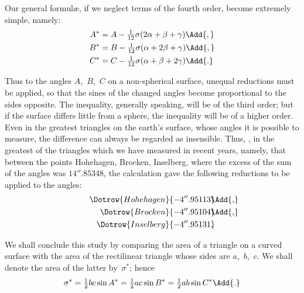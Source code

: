 
Our general formulæ, if we neglect terms of the fourth order, become extremely
simple, namely:
\begin{align*}
A^{*} &= A - \tfrac{1}{12}\sigma(2\alpha + \beta + \gamma)\Add{,} \\
B^{*} &= B - \tfrac{1}{12}\sigma(\alpha + 2\beta + \gamma)\Add{,} \\
C^{*} &= C - \tfrac{1}{12}\sigma(\alpha + \beta + 2\gamma)\Add{.}
\end{align*}

Thus to the angles $A$,~$B$,~$C$ on a non-spherical surface, unequal reductions must
be applied, so that the sines of the changed angles become proportional to the sides
opposite. The inequality, generally speaking, will be of the third order; but if the
surface differs little from a sphere, the inequality will be of a higher order. Even in
the greatest triangles on the earth's surface, whose angles it is possible to measure,
the difference can always be regarded as insensible. Thus, \eg, in the greatest of
the triangles which we have measured in recent years, namely, that between the
points Hohehagen, Brocken, Inselberg, where the excess of the sum of the angles was
$14''. 85348$, the calculation gave the following reductions to be applied to the angles:
\setlength{\TmpLen}{2in}%
\begin{align*}
\Dotrow{Hohehagen}{-4''.95113\rlap{\Add{,}}} \\
\Dotrow{Brocken}{- 4''.95104\rlap{\Add{,}}} \\
\Dotrow{Inselberg}{-4''.95131\rlap{.}}
\end{align*}



We shall conclude this study by comparing the area of a triangle on a curved
surface with the area of the rectilinear triangle whose sides are $a$,~$b$,~$c$. We shall
denote the area of the latter by~$\sigma^{*}$; hence
\[
\sigma^{*} = \tfrac{1}{2}bc\sin A^{*}
           = \tfrac{1}{2}ac\sin B^{*}
           = \tfrac{1}{2}ab\sin C^{*}\Add{.}
\]

